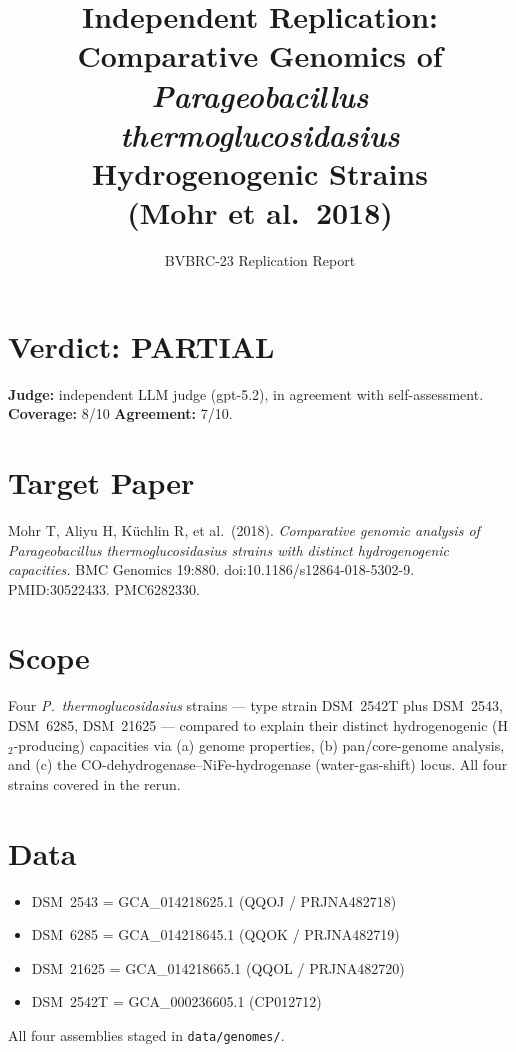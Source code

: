 \documentclass[11pt]{article}
\title{Independent Replication: Comparative Genomics of\\
\textit{Parageobacillus thermoglucosidasius} Hydrogenogenic Strains\\
(Mohr et al.\ 2018)}
\author{BVBRC-23 Replication Report}
\date{}
\begin{document}
\maketitle

\section*{Verdict: PARTIAL}
\textbf{Judge:} independent LLM judge (gpt-5.2), in agreement with self-assessment.\\
\textbf{Coverage:} 8/10 \quad \textbf{Agreement:} 7/10.

\section{Target Paper}
Mohr T, Aliyu H, K\"uchlin R, et al.\ (2018).
\textit{Comparative genomic analysis of Parageobacillus thermoglucosidasius strains
with distinct hydrogenogenic capacities.}
BMC Genomics 19:880. doi:10.1186/s12864-018-5302-9. PMID:30522433. PMC6282330.

\section{Scope}
Four \textit{P.\ thermoglucosidasius} strains --- type strain DSM~2542T plus DSM~2543,
DSM~6285, DSM~21625 --- compared to explain their distinct hydrogenogenic
(H$_2$-producing) capacities via (a) genome properties, (b) pan/core-genome analysis,
and (c) the CO-dehydrogenase--NiFe-hydrogenase (water-gas-shift) locus. All four
strains covered in the rerun.

\section{Data}
\begin{itemize}
  \item DSM~2543 = GCA\_014218625.1 (QQOJ / PRJNA482718)
  \item DSM~6285 = GCA\_014218645.1 (QQOK / PRJNA482719)
  \item DSM~21625 = GCA\_014218665.1 (QQOL / PRJNA482720)
  \item DSM~2542T = GCA\_000236605.1 (CP012712)
\end{itemize}
All four assemblies staged in \texttt{data/genomes/}.
\end{document}
